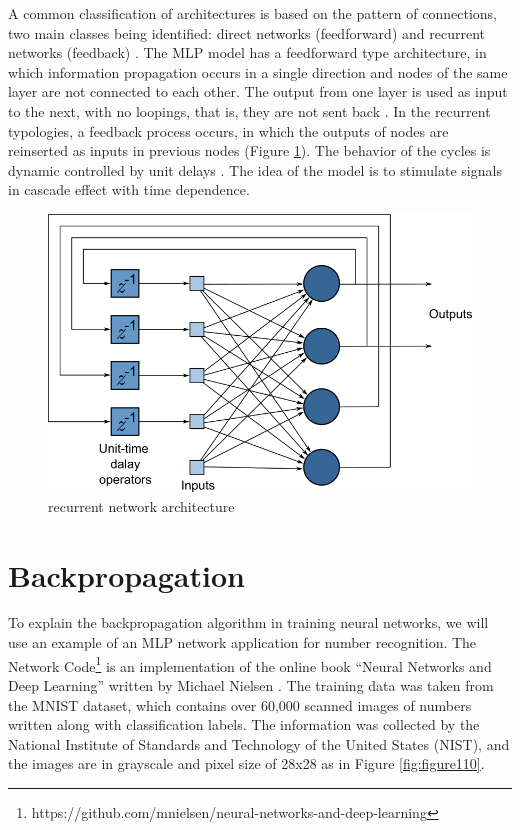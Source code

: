 A common classification of architectures is based on the pattern of connections, two main classes being identified: direct networks (feedforward) and recurrent networks (feedback) \cite{haykin1999}. The MLP model has a feedforward type architecture, in which information propagation occurs in a single direction and nodes of the same layer are not connected to each other. The output from one layer is used as input to the next, with no loopings, that is, they are not sent back \cite{haykin1999}.
In the recurrent typologies, a feedback process occurs, in which the outputs of nodes are reinserted as inputs in previous nodes (Figure \ref{fig:figure109}). The behavior of the cycles is dynamic controlled by unit delays \cite{haykin1999}. The idea of the model is to stimulate signals in cascade effect with time dependence.

\begin{figure}
    \centering
    \includegraphics[scale=0.65]{images/figure109.png}
    \caption{recurrent network architecture \cite{haykin1999}}
    \label{fig:figure109}
\end{figure}

\section{Backpropagation}\label{backpropagation}

To explain the backpropagation algorithm in training neural networks, we will use an example of an MLP network application for number recognition. The Network Code\footnote{https://github.com/mnielsen/neural-networks-and-deep-learning} is an implementation of the online book “Neural Networks and Deep Learning” written by Michael Nielsen \cite{nielsen2015}. The training data was taken from the MNIST dataset, which contains over 60,000 scanned images of numbers written along with classification labels. The information was collected by the National Institute of Standards and Technology of the United States (NIST), and the images are in grayscale and pixel size of 28x28 as in Figure \ref{fig:figure110}.

